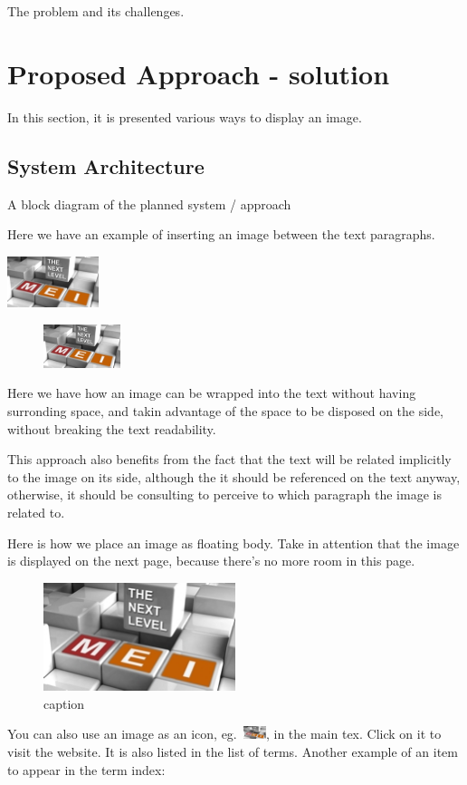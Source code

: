 The problem and its challenges.

\section{Proposed Approach - solution}
In this section, it is presented various ways to display an image.
 \subsection{System Architecture}
 A block diagram of the planned system / approach

Here we have an example of inserting an image between the text paragraphs.
\begin{center}
    \includegraphics[width=0.2\textwidth]{img/mei-logo-03.jpg}
\end{center}

\begin{figure}	
    \includegraphics[width=0.2\textwidth]{img/mei-logo-03.jpg}
\end{figure}
Here we have how an image can be wrapped into the text without having surronding space, and takin advantage of the space to be disposed on the side, without breaking the text readability.

This approach also benefits from the fact that the text will be related implicitly to the image on its side, although the it should be referenced on the text anyway, otherwise, it should be consulting to perceive to which paragraph the image is related to.

Here is how we place an image as floating body.
Take in attention that the image is displayed on the next page, because there's no more room in this page.
\begin{figure}
\begin{center}
    \includegraphics[width=0.5\textwidth]{img/mei-logo-03.jpg}
\end{center}
\caption{caption}
\end{figure}

You can also use an image as an icon, eg.~\href{http://mei.di.uminho.pt}{\includegraphics[width=0.05\textwidth]{img/mei-logo-03.jpg}}, in the main tex.
Click on it to visit the website. It is also listed in the list of terms.
Another example of an item to appear in the term index: %
